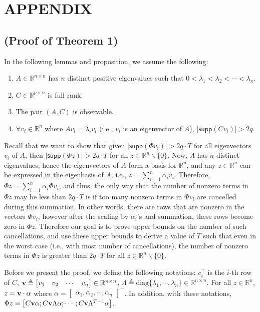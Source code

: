 \documentclass[journal]{IEEEtran}
\begin{document}
\section*{APPENDIX}

\subsection*{(Proof of Theorem 1)}
In the following lemmas and proposition, we assume the following:
\begin{enumerate}
\item $A \in \mathbb{R}^{n\times n}$ has $n$ distinct positive eigenvalues such that $0 < \lambda_1 < \lambda_2 < \cdots < \lambda_n$.\item $C \in \mathbb{R}^{p \times n}$ is full rank. 
\item The pair $(A,C)$ is observable.
\item $\forall v_i \in \mathbb{R}^n$ where  $ Av_i = \lambda_i v_i $ (i.e., $v_i$ is an eigenvector of $A$), $ \lvert \textsf{supp}(Cv_i) \rvert > 2q$.
\end{enumerate}

Recall that we want to show that given $\lvert \textsf{supp} (\Phi v_i) \rvert > 2q\cdot T $ for all eigenvectors $v_i$ of $A$, then $\lvert \textsf{supp} (\Phi z) \rvert > 2q\cdot T $ for all $z \in \mathbb{R}^n \backslash \{0\}$. Now, $A$ has $n$ distinct eigenvalues, hence the eigenvectors of $A$ form a basis for $\mathbb{R}^n$, and any $z \in \mathbb{R}^n$ can be expressed in the eigenbasis of $A$, i.e., $ z = \sum_{i=1}^n \alpha_i v_i$. Therefore, $\Phi z = \sum_{i=1}^n \alpha_i \Phi v_i$, and thus, the only way that the number of nonzero terms in $\Phi z$ may be less than $2q\cdot T$ is if too many nonzero terms in $\Phi v_i$ are cancelled during this summation. 
In other words, there are rows that are nonzero in the vectors $\Phi v_i$, however after the scaling by $\alpha_i$'s and summation, these rows become zero in $\Phi z$. Therefore our goal is to prove upper bounds on the number of such cancellations, and use these upper bounds to derive a value of $T$ such that even in the worst case (i.e., with most number of cancellations), the number of nonzero terms in $\Phi z$ is greater than $2q\cdot T$ for all $z \in \mathbb{R}^n \backslash \{0\}$.

Before we present the proof, we define the following notations: $c_i^\top$ is the $i$-th row of $C$, ${\bf v} \triangleq \begin{bmatrix} v_1 & v_2 & \cdots & v_n \end{bmatrix} \in \mathbb{R}^{n \times n}$, $\Lambda \triangleq \text{diag}\{ \lambda_1, \cdots , \lambda_n \} \in \mathbb{R}^{n \times n}$. For all $z \in \mathbb{R}^n$, $ z = {\bf v} \cdot \alpha$ where $\alpha = \begin{bmatrix} \alpha_1, \alpha_2, \cdots, \alpha_n \end{bmatrix}^\top $.
In addition, with these notations, $\Phi z = \begin{bmatrix} C {\bf v} \alpha; C {\bf v} \Lambda \alpha; \cdots; C {\bf v} \Lambda^{T-1} \alpha \end{bmatrix}$.
\end{document}
